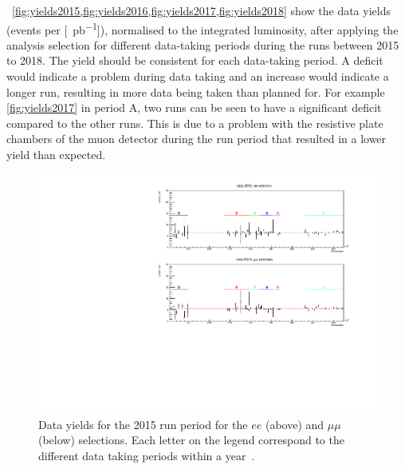 ~\cref{fig:yields2015,fig:yields2016,fig:yields2017,fig:yields2018} show the data yields (events per [\SI{}{\pico\barn^{-1}}]), normalised to the integrated luminosity, after applying the analysis selection for different data-taking periods during the runs between 2015 to 2018. The yield should be consistent for each data-taking period. A deficit would indicate a problem during data taking and an increase would indicate a longer run, resulting in more data being taken than planned for. For example \cref{fig:yields2017} in period A, two runs can be seen to have a significant deficit compared to the other runs. This is due to a problem with the resistive plate chambers of the muon detector during the run period that resulted in a lower yield than expected. 

\begin{figure}[ht]
\centering
\includegraphics[width=\textwidth]{figures/analysis/datamc/Yields/compare_data_yields2015.pdf}
\caption[Data yields for the 2015 run period for the $ee$ (above) and $\mu\mu$ (below) selections.]{Data yields for the 2015 run period for the $ee$ (above) and $\mu\mu$ (below) selections. Each letter on the legend correspond to the different data taking periods within a year~\cite{Aad:2019fac}.}
\label{fig:yields2015}
\end{figure}

